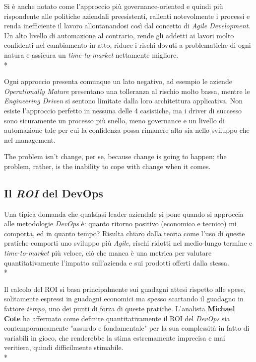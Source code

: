\documentclass[../main.tex]{subfiles}
\begin{document}
            Si è anche notato come l'approccio più governance-oriented e quindi più rispondente alle politiche aziendali preesistenti, rallenti notevolmente i processi e renda inefficiente il lavoro allontanandosi così dal concetto di \emph{Agile Development}. Un alto livello di automazione al contrario, rende gli addetti ai lavori molto confidenti nel cambiamento in atto, riduce i rischi dovuti a problematiche di ogni natura e assicura un \emph{time-to-market} nettamente migliore.\\*
        
            Ogni approccio presenta comunque un lato negativo, ad esempio le aziende \emph{Operationally Mature} presentano una tolleranza al rischio molto bassa, mentre le \emph{Engineering Driven} si sentono limitate dalla loro architettura applicativa. Non esiste l'approccio perfetto in nessuna delle 4 casistiche, ma i driver di successo sono sicuramente un processo più snello, meno governance e un livello di automazione tale per cui la confidenza possa rimanere alta sia nello sviluppo che nel management.
        
            \begin{fquote}
        	 	The problem isn't change, per se, because change is going to happen; the problem, rather, is the inability to cope with change when it comes.
         	\end{fquote}
        
            \subsection{Il \emph{ROI} del DevOps}
        
                Una tipica domanda che qualsiasi leader aziendale si pone quando si approccia alle metodologie \emph{DevOps} è: quanto ritorno positivo (economico e tecnico) mi comporta, ed in quanto tempo?
                Risulta chiaro dalla teoria come l'uso di queste pratiche comporti uno sviluppo più \emph{Agile}, rischi ridotti nel medio-lungo termine e \emph{time-to-market} più veloce, ciò che manca è una metrica per valutare quantitativamente l'impatto sull'azienda e sui prodotti offerti dalla stessa.\\*
                
                Il calcolo del ROI\cite{devops_roi} si basa principalmente sui guadagni attesi rispetto alle spese, solitamente espressi in guadagni economici ma spesso scartando il guadagno in fattore \emph{tempo}, uno dei punti di forza di queste pratiche. L'analista \textbf{Michael Cote} ha affermato come definire quantitativamente il ROI del \emph{DevOps} sia contemporaneamente "assurdo e fondamentale" per la sua complessità in fatto di variabili in gioco, che renderebbe la stima estremamente imprecisa e mai veritiera, quindi difficilmente stimabile.\\*
                
\end{document}
